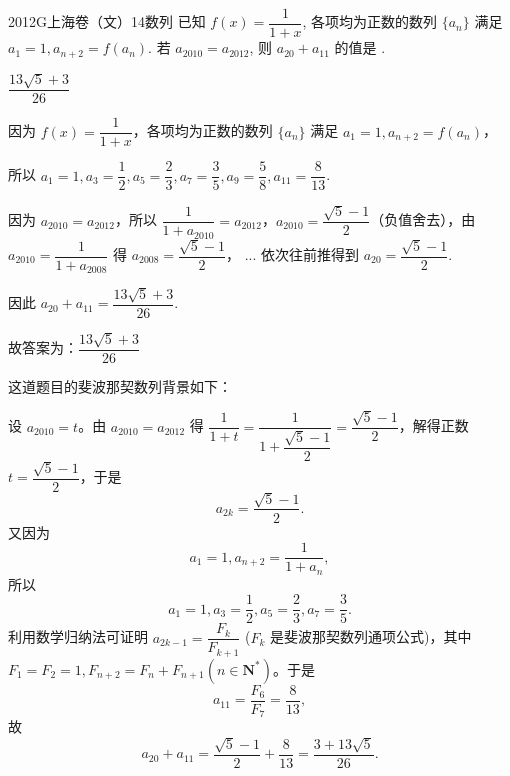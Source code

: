 
\begin{problem}{2012}{G}{上海卷（文）}{14}{数列}
已知 $f(x)=\dfrac{1}{1+x}$, 各项均为正数的数列 $\{a_n\}$ 满足 $a_1=1, a_{n+2}=f(a_n)$. 若 $a_{2010}=a_{2012}$, 则 $a_{20}+a_{11}$ 的值是 \underline{\hspace{4em}}.
\end{problem}

\begin{answer}
$\dfrac{13\sqrt{5}+3}{26}$
\end{answer}

\begin{solutions}[解法一]
因为 $f(x) = \dfrac{1}{1+x}$，各项均为正数的数列 $\{a_n\}$ 满足 $a_1=1, a_{n+2}=f(a_n)$，

所以 $a_1=1, a_3=\dfrac{1}{2}, a_5=\dfrac{2}{3}, a_7=\dfrac{3}{5}, a_9=\dfrac{5}{8}, a_{11}=\dfrac{8}{13}$.

因为 $a_{2010}=a_{2012}$，所以 $\dfrac{1}{1+a_{2010}}=a_{2012}$，$a_{2010}=\dfrac{\sqrt{5}-1}{2}$（负值舍去），由 $a_{2010}=\dfrac{1}{1+a_{2008}}$ 得 $a_{2008}=\dfrac{\sqrt{5}-1}{2}$， ... 依次往前推得到 $a_{20}=\dfrac{\sqrt{5}-1}{2}$.

因此 $a_{20}+a_{11} = \dfrac{13\sqrt{5}+3}{26}$.

故答案为：$\dfrac{13\sqrt{5}+3}{26}$
\end{solutions}

\begin{solutions}[解法二]
这道题目的斐波那契数列背景如下：

设 $a_{2010}=t$。由 $a_{2010}=a_{2012}$ 得 $\dfrac{1}{1+t}=\dfrac{1}{1+\dfrac{\sqrt{5}-1}{2}}=\dfrac{\sqrt{5}-1}{2}$，解得正数 $t = \dfrac{\sqrt{5}-1}{2}$，于是
$$
a_{2k} = \dfrac{\sqrt{5}-1}{2}.
$$
又因为
$$
a_1=1, a_{n+2} = \dfrac{1}{1+a_n},
$$
所以
$$
a_1=1, a_3=\dfrac{1}{2}, a_5=\dfrac{2}{3}, a_7=\dfrac{3}{5}.
$$
利用数学归纳法可证明 $a_{2k-1} = \dfrac{F_k}{F_{k+1}}$ ($F_k$ 是斐波那契数列通项公式)，其中 $F_1=F_2=1, F_{n+2}=F_n+F_{n+1} (n \in \mathbf{N}^*)$。于是
$$
a_{11} = \dfrac{F_6}{F_7} = \dfrac{8}{13},
$$
故
$$
a_{20}+a_{11} = \dfrac{\sqrt{5}-1}{2} + \dfrac{8}{13} = \dfrac{3+13\sqrt{5}}{26}.
$$
\end{solutions}
